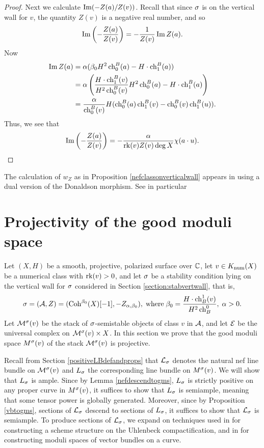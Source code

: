 \begin{proof}
    Next we calculate $\operatorname{\mathrm{Im}}(-Z(a)/Z(v))$. Recall that since $\sigma$ is on the vertical wall for $v$, the quantity $Z(v)$ is a negative real number, and so 
    \[ \operatorname{\mathrm{Im}}\left(-\frac{Z(a)}{Z(v)}\right) = -\frac{1}{Z(v)} \operatorname{\mathrm{Im}} Z(a). \]
    Now 
    \begin{align*}
        \operatorname{\mathrm{Im}} Z(a) & = \alpha(\beta_0 H^2 \operatorname{\mathrm{ch}}^B_0(a) - H \cdot \operatorname{\mathrm{ch}}^B_1(a)) \\
        & = \alpha \left( \frac{H \cdot \operatorname{\mathrm{ch}}^B_1(v)}{H^2 \operatorname{\mathrm{ch}}^B_0(v)} H^2 \operatorname{\mathrm{ch}}^B_0(a) - H \cdot \operatorname{\mathrm{ch}}^B_1(a) \right) \\
        & = \frac{\alpha}{\operatorname{\mathrm{ch}}^B_0(v)} H (\operatorname{\mathrm{ch}}^B_0(a) \operatorname{\mathrm{ch}}^B_1(v) - \operatorname{\mathrm{ch}}^B_0(v) \operatorname{\mathrm{ch}}^B_1(u)).
    \end{align*}
    Thus, we see that
    \[ \operatorname{\mathrm{Im}}\left(-\frac{Z(a)}{Z(v)}\right) = -\frac{\alpha}{\operatorname{\mathrm{rk}}(v) Z(v) \deg X} \chi(a \cdot u). \]
\end{proof}

\begin{rmk}
    The calculation of $w_Z$ as in Proposition \ref{nefclassonverticalwall} appears in \cite{liuwanmin} using a dual version of the Donaldson morphism. See in particular \cite[Theorem 4.13(b)]{liuwanmin}
\end{rmk}



\section{Projectivity of the good moduli space}

Let $(X, H)$ be a smooth, projective, polarized surface over $\mathbb{C}$, let $v \in K_{\mathrm{num}}(X)$ be a numerical class with $\operatorname{\mathrm{rk}}(v) > 0$, and let $\sigma$ be a stability condition lying on the vertical wall for $\sigma$ considered in Section \ref{section:stabvertwall}, that is,
\[ \sigma = (\mathcal{A}, Z) = (\operatorname{\mathrm{Coh}}^{\beta_0}(X)[-1], -Z_{\alpha, \beta_0}), \; \mathrm{where} \; \beta_0 = \frac{H \cdot \operatorname{\mathrm{ch}}_B^1(v)}{H^2 \operatorname{\mathrm{ch}}_B^0}, \; \alpha > 0. \]
Let $\mathcal{M}^\sigma(v)$ be the stack of $\sigma$-semistable objects of class $v$ in $\mathcal{A}$, and let $\mathcal{E}$ be the universal complex on $\mathcal{M}^\sigma(v) \times X$. In this section we prove that the good moduli space $M^\sigma(v)$ of the stack $\mathcal{M}^\sigma(v)$ is projective. 

Recall from Section \ref{positiveLBdefandprops} that $\mathcal{L}_\sigma$ denotes the natural nef line bundle on $\mathcal{M}^\sigma(v)$ and $L_\sigma$ the corresponding line bundle on $M^\sigma(v)$. We will show that $L_\sigma$ is ample. Since by Lemma \ref{nefdescendtogms}, $L_\sigma$ is strictly positive on any proper curve in $M^\sigma(v)$, it suffices to show that $L_\sigma$ is semiample, meaning that some tensor power is globally generated. Moreover, since by Proposition \ref{vbtogms}, sections of $\mathcal{L}_\sigma$ descend to sections of $L_\sigma$, it suffices to show that $\mathcal{L}_\sigma$ is semiample. To produce sections of $\mathcal{L}_\sigma$, we expand on techniques used in \cite{li} for constructing a scheme structure on the Uhlenbeck compactification, and in \cite{seshadri} for constructing moduli spaces of vector bundles on a curve. 

